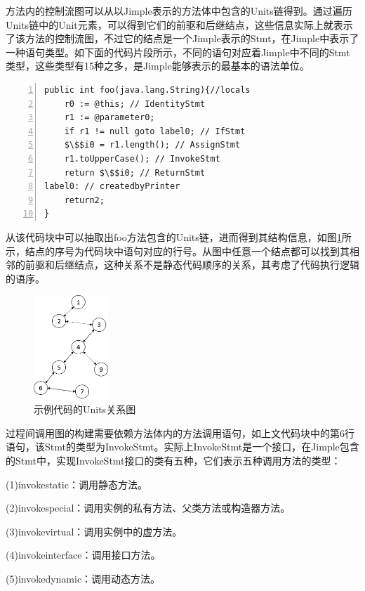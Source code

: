 方法内的控制流图可以从以Jimple表示的方法体中包含的Units链得到。通过遍历Units链中的Unit元素，可以得到它们的前驱和后继结点，这些信息实际上就表示了该方法的控制流图，不过它的结点是一个Jimple表示的Stmt，在Jimple中表示了一种语句类型。如下面的代码片段所示，不同的语句对应着Jimple中不同的Stmt类型，这些类型有15种之多，是Jimple能够表示的最基本的语法单位。
\begin{lstlisting}[language={[AspectJ]Java},numbers=left,keywordstyle=\color{blue!70},commentstyle=\color{red!50!green!50!blue!50},frame=shadowbox, rulesepcolor=\color{red!20!green!20!blue!20}] 
public int foo(java.lang.String){//locals
    r0 := @this; // IdentityStmt
    r1 := @parameter0;
    if r1 != null goto label0; // IfStmt
    $\$$i0 = r1.length(); // AssignStmt
    r1.toUpperCase(); // InvokeStmt
    return $\$$i0; // ReturnStmt
label0: // createdbyPrinter
    return2;
}
\end{lstlisting}
从该代码块中可以抽取出foo方法包含的Units链，进而得到其结构信息，如图\ref{fig:figure4-5}所示，结点的序号为代码块中语句对应的行号。从图中任意一个结点都可以找到其相邻的前驱和后继结点，这种关系不是静态代码顺序的关系，其考虑了代码执行逻辑的语序。

\begin{figure}
	\centering
	\includegraphics[width=0.25\textwidth]{figures/Units4-5}
	\caption{示例代码的Units关系图}\label{fig:figure4-5}
\end{figure}

过程间调用图的构建需要依赖方法体内的方法调用语句，如上文代码块中的第6行语句，该Stmt的类型为InvokeStmt。实际上InvokeStmt是一个接口，在Jimple包含的Stmt中，实现InvokeStmt接口的类有五种，它们表示五种调用方法的类型：

(1)invokestatic：调用静态方法。

(2)invokespecial：调用实例的私有方法、父类方法或构造器方法。

(3)invokevirtual：调用实例中的虚方法。

(4)invokeinterface：调用接口方法。

(5)invokedynamic：调用动态方法。

